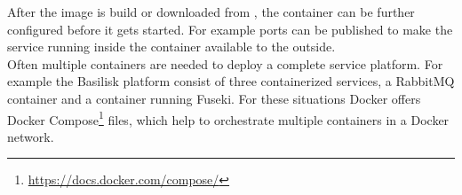 After the image is build or downloaded from \dockh{}, the container can be further configured before it gets started.
For example ports can be published to make the service running inside the container available to the outside.
\\

Often multiple containers are needed to deploy a complete service platform.
For example the Basilisk platform consist of three containerized services, a RabbitMQ container and a container running Fuseki.
For these situations Docker offers Docker Compose\footnote{\url{https://docs.docker.com/compose/}} files, which help to orchestrate multiple containers in a Docker network.



%
%
%
%
%
%
%
%
%



